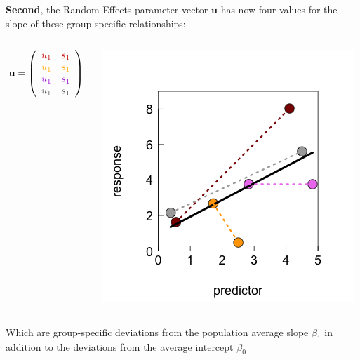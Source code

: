 \documentclass{beamer}
\begin{document}
\begin{frame}
\textbf{Second}, the Random Effects parameter vector $\mathbf{u}$ has now four values for the slope of these group-specific relationships:
    \begin{columns}
        \begin{column}{0.55\textwidth}
        \small
\[
\mathbf{u} = \left( 
\begin{array}{cc} 
\color{darkred}{u_1} & \color{darkred}{s_1} \\
\color{orange}{u_1} & \color{orange}{s_1} \\
\color{violet}{u_1} & \color{violet}{s_1} \\
\color{darkgray}{u_1} & \color{darkgray}{s_1} \\
\end{array}\right)
\]
        \end{column}
        \begin{column}{0.45\textwidth}
            \includegraphics[width=\textwidth]{lectures/day_5_theory_of_mems/figures/unnamed-chunk-10-1.png}
        \end{column}
    \end{columns}

Which are group-specific deviations from the population average slope $\beta_1$ in addition to the deviations from the average intercept $\beta_0$
\end{frame}
\end{document}
